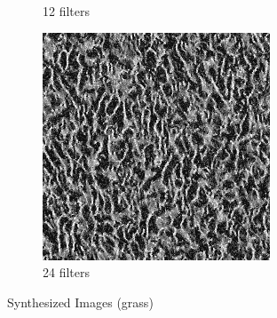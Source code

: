 \documentclass[11pt, oneside]{article}   	%
\begin{document}
\begin{figure}[H]
\begin{subfigure}[b]{0.3\textwidth}
        \caption{12 filters}
        \label{fig:grass12}
    \end{subfigure}
    \begin{subfigure}[b]{0.3\textwidth}
        \includegraphics[width=\textwidth]{grass24}
        \caption{24 filters}
        \label{fig:grass24}
    \end{subfigure}
    \caption{Synthesized Images (grass)}\label{fig:grasss}
\end{figure}
\end{document}
